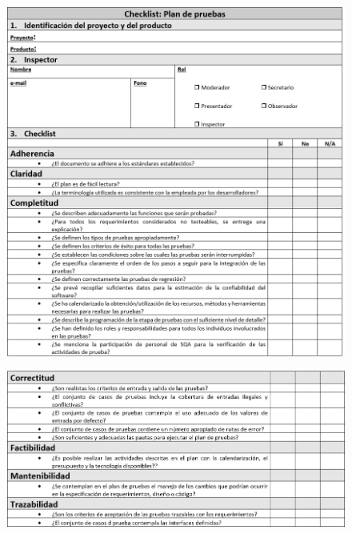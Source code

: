 \begin{figure}[H]
\centering
\includegraphics[width=1\textwidth]{figures/anexos/3-2-4a.PNG}
\end{figure}

\begin{figure}[H]
\centering
\includegraphics[width=1\textwidth]{figures/anexos/3-2-4b.PNG}
\end{figure}

